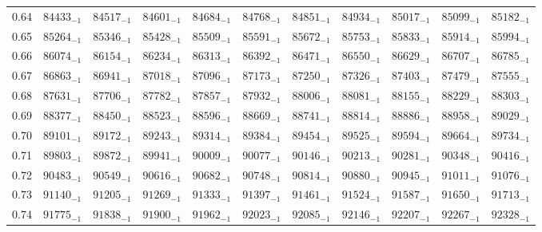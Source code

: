 \documentclass[10pt, a4paper]{article}
\begin{document}
\begin{center}
\begin{longtable}{c || c c c c c | c c c c c}
        0.64 & \({84433}_{-1}\) & \({84517}_{-1}\) & \({84601}_{-1}\) & \({84684}_{-1}\) & \({84768}_{-1}\) & \({84851}_{-1}\) & \({84934}_{-1}\) & \({85017}_{-1}\) & \({85099}_{-1}\) & \({85182}_{-1}\)\\
        0.65 & \({85264}_{-1}\) & \({85346}_{-1}\) & \({85428}_{-1}\) & \({85509}_{-1}\) & \({85591}_{-1}\) & \({85672}_{-1}\) & \({85753}_{-1}\) & \({85833}_{-1}\) & \({85914}_{-1}\) & \({85994}_{-1}\)\\
        0.66 & \({86074}_{-1}\) & \({86154}_{-1}\) & \({86234}_{-1}\) & \({86313}_{-1}\) & \({86392}_{-1}\) & \({86471}_{-1}\) & \({86550}_{-1}\) & \({86629}_{-1}\) & \({86707}_{-1}\) & \({86785}_{-1}\)\\
        0.67 & \({86863}_{-1}\) & \({86941}_{-1}\) & \({87018}_{-1}\) & \({87096}_{-1}\) & \({87173}_{-1}\) & \({87250}_{-1}\) & \({87326}_{-1}\) & \({87403}_{-1}\) & \({87479}_{-1}\) & \({87555}_{-1}\)\\
        0.68 & \({87631}_{-1}\) & \({87706}_{-1}\) & \({87782}_{-1}\) & \({87857}_{-1}\) & \({87932}_{-1}\) & \({88006}_{-1}\) & \({88081}_{-1}\) & \({88155}_{-1}\) & \({88229}_{-1}\) & \({88303}_{-1}\)\\
        0.69 & \({88377}_{-1}\) & \({88450}_{-1}\) & \({88523}_{-1}\) & \({88596}_{-1}\) & \({88669}_{-1}\) & \({88741}_{-1}\) & \({88814}_{-1}\) & \({88886}_{-1}\) & \({88958}_{-1}\) & \({89029}_{-1}\)\\
        \hline
        0.70 & \({89101}_{-1}\) & \({89172}_{-1}\) & \({89243}_{-1}\) & \({89314}_{-1}\) & \({89384}_{-1}\) & \({89454}_{-1}\) & \({89525}_{-1}\) & \({89594}_{-1}\) & \({89664}_{-1}\) & \({89734}_{-1}\)\\
        0.71 & \({89803}_{-1}\) & \({89872}_{-1}\) & \({89941}_{-1}\) & \({90009}_{-1}\) & \({90077}_{-1}\) & \({90146}_{-1}\) & \({90213}_{-1}\) & \({90281}_{-1}\) & \({90348}_{-1}\) & \({90416}_{-1}\)\\
        0.72 & \({90483}_{-1}\) & \({90549}_{-1}\) & \({90616}_{-1}\) & \({90682}_{-1}\) & \({90748}_{-1}\) & \({90814}_{-1}\) & \({90880}_{-1}\) & \({90945}_{-1}\) & \({91011}_{-1}\) & \({91076}_{-1}\)\\
        0.73 & \({91140}_{-1}\) & \({91205}_{-1}\) & \({91269}_{-1}\) & \({91333}_{-1}\) & \({91397}_{-1}\) & \({91461}_{-1}\) & \({91524}_{-1}\) & \({91587}_{-1}\) & \({91650}_{-1}\) & \({91713}_{-1}\)\\
        0.74 & \({91775}_{-1}\) & \({91838}_{-1}\) & \({91900}_{-1}\) & \({91962}_{-1}\) & \({92023}_{-1}\) & \({92085}_{-1}\) & \({92146}_{-1}\) & \({92207}_{-1}\) & \({92267}_{-1}\) & \({92328}_{-1}\)\\

\end{longtable}
\end{center}
\end{document}
